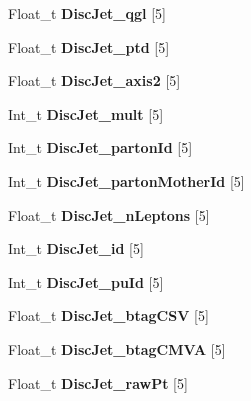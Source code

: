 \begin{DoxyCompactItemize}
Float\+\_\+t {\bfseries Disc\+Jet\+\_\+qgl} \mbox{[}5\mbox{]}
\item 
\hypertarget{classMiniTree_a8d012de308c1353fea2067e634fb631a}{}\label{classMiniTree_a8d012de308c1353fea2067e634fb631a} 
Float\+\_\+t {\bfseries Disc\+Jet\+\_\+ptd} \mbox{[}5\mbox{]}
\item 
\hypertarget{classMiniTree_aea8cf3b0d2459ec029cffc665f744695}{}\label{classMiniTree_aea8cf3b0d2459ec029cffc665f744695} 
Float\+\_\+t {\bfseries Disc\+Jet\+\_\+axis2} \mbox{[}5\mbox{]}
\item 
\hypertarget{classMiniTree_a529fb17dd1534dc38461803e1a0b2d3b}{}\label{classMiniTree_a529fb17dd1534dc38461803e1a0b2d3b} 
Int\+\_\+t {\bfseries Disc\+Jet\+\_\+mult} \mbox{[}5\mbox{]}
\item 
\hypertarget{classMiniTree_af357a2287e5bd7a04c1a4ebe184d9f2f}{}\label{classMiniTree_af357a2287e5bd7a04c1a4ebe184d9f2f} 
Int\+\_\+t {\bfseries Disc\+Jet\+\_\+parton\+Id} \mbox{[}5\mbox{]}
\item 
\hypertarget{classMiniTree_a0a37c283a3c98a68087ef7b898eef64f}{}\label{classMiniTree_a0a37c283a3c98a68087ef7b898eef64f} 
Int\+\_\+t {\bfseries Disc\+Jet\+\_\+parton\+Mother\+Id} \mbox{[}5\mbox{]}
\item 
\hypertarget{classMiniTree_a39e67db376d8628f0a1972bec2bec2e5}{}\label{classMiniTree_a39e67db376d8628f0a1972bec2bec2e5} 
Float\+\_\+t {\bfseries Disc\+Jet\+\_\+n\+Leptons} \mbox{[}5\mbox{]}
\item 
\hypertarget{classMiniTree_a40717fe1c51656c60b05a624acfc7f97}{}\label{classMiniTree_a40717fe1c51656c60b05a624acfc7f97} 
Int\+\_\+t {\bfseries Disc\+Jet\+\_\+id} \mbox{[}5\mbox{]}
\item 
\hypertarget{classMiniTree_aab60e63e0c5f7808faa7faa8ff8ac37b}{}\label{classMiniTree_aab60e63e0c5f7808faa7faa8ff8ac37b} 
Int\+\_\+t {\bfseries Disc\+Jet\+\_\+pu\+Id} \mbox{[}5\mbox{]}
\item 
\hypertarget{classMiniTree_acb990f5fe5b47aa9c0d982cab151beff}{}\label{classMiniTree_acb990f5fe5b47aa9c0d982cab151beff} 
Float\+\_\+t {\bfseries Disc\+Jet\+\_\+btag\+C\+SV} \mbox{[}5\mbox{]}
\item 
\hypertarget{classMiniTree_a1ee0b8a04639da0493ed4e5d725a8ff9}{}\label{classMiniTree_a1ee0b8a04639da0493ed4e5d725a8ff9} 
Float\+\_\+t {\bfseries Disc\+Jet\+\_\+btag\+C\+M\+VA} \mbox{[}5\mbox{]}
\item 
\hypertarget{classMiniTree_a8f0b21a9e20e0b364dd2072f349e402e}{}\label{classMiniTree_a8f0b21a9e20e0b364dd2072f349e402e} 
Float\+\_\+t {\bfseries Disc\+Jet\+\_\+raw\+Pt} \mbox{[}5\mbox{]}

\end{DoxyCompactItemize}
